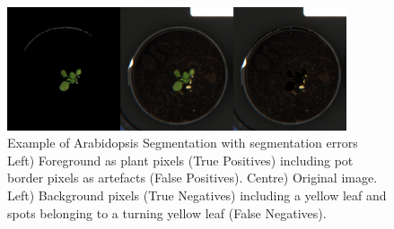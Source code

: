 \documentclass{frontiersSCNS} %
\begin{document}
\begin{figure}[h!]
\begin{center}
\includegraphics[width=10cm]{Figure2.png}
\end{center}
 \caption{Example of Arabidopsis Segmentation with segmentation errors Left) Foreground as plant pixels (True Positives) including pot border pixels as artefacts (False Positives). Centre) Original image. Left) Background pixels (True Negatives) including a yellow leaf and spots belonging to a turning yellow leaf (False Negatives).}\label{fig1:segmentation}
\end{figure}
\end{document}
